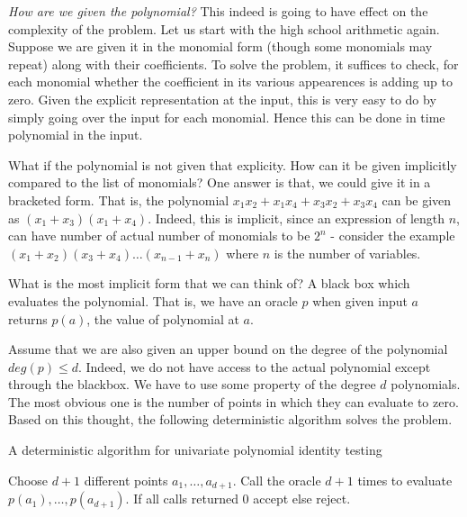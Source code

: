 \textit{How are we given the polynomial?} This indeed is going to have effect
on the complexity of the problem.  Let us start with the high school
arithmetic again. Suppose we are given it in the monomial form (though
some monomials may repeat) along with their coefficients. To solve the
problem, it suffices to check, for each monomial whether the
coefficient in its various appearences is adding up to zero. Given the
explicit representation at the input, this is very easy to do by
simply going over the input for each monomial. Hence this can be done
in time polynomial in the input.

What if the polynomial is not given that explicity. How can it be given implicitly compared to the list of monomials? One answer is that, we could give it in a bracketed form. That is, the polynomial $x_1x_2+x_1x_4+x_3x_2+x_3x_4$ can be given as $(x_1+x_3)(x_1+x_4)$.
Indeed, this is implicit, since an expression of length $n$, can have number of actual number of monomials to be $2^n$ - consider the example $(x_1+x_2)(x_3+x_4) \ldots (x_{n-1}+x_n)$ where $n$ is the number of variables.

What is the most implicit form that we can think of? A black box which evaluates the polynomial. That is, we have an oracle $p$ when given input $a$ returns $p(a)$, the value of polynomial 
at $a$.


Assume that we are also given an upper bound on the degree of the
polynomial $deg(p) \leq d$.  Indeed, we do not have access to the
actual polynomial except through the blackbox. We have to use some
property of the degree $d$ polynomials. The most obvious one is the
number of points in which they can evaluate to zero. Based on this thought, 
the following deterministic algorithm solves the problem.


\begin{algorithm}%
\label{alg:univariate-pit}
\caption{A deterministic algorithm for univariate polynomial identity testing}
\begin{algorithmic}[1]
\State Choose $d + 1$ different points $a_1 , \ldots , a_{d+1}$.
\State Call the oracle $d+1$ times to evaluate $p(a_1), \ldots , p(a_{d+1})$.
\State If all calls returned 0 accept else reject.
\end{algorithmic}
\end{algorithm}

